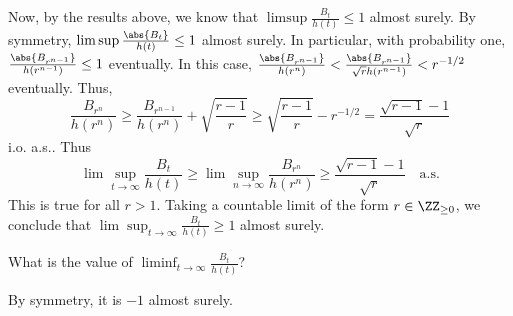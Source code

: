 \documentclass{scrartcl}
\begin{document}
Now, by the results above, we know that $\limsup \frac{B_t}{h(t)} \leq 1$ almost surely. By symmetry, $\limsup \frac{\abs{B_t}}{h(t)} \leq 1$ almost surely. In particular, with probability one, $\frac{\abs{B_{r^{n-1}}}}{h(r^{n-1})} \leq 1$ eventually. In this case, $\frac{\abs{B_{r^{n-1}}}}{h(r^n)} < \frac{\abs{B_{r^{n-1}}}}{\sqrt{r} h(r^{n-1})} < r^{-1/2}$ eventually. Thus,
\[
    \frac{B_{r^n}}{h(r^n)} \geq \frac{B_{r^{n-1}}}{h(r^n)} + \sqrt{\frac{r-1}{r}} \geq \sqrt{\frac{r-1}{r}} - r^{-1/2} = \frac{\sqrt{r-1} - 1}{\sqrt{r}}
\]
i.o. a.s.. Thus
\[
    \lim\sup_{t\to\infty} \frac{B_t}{h(t)} \geq \lim\sup_{n\to\infty} \frac{B_{r^n}}{h(r^n)} \geq \frac{\sqrt{r-1} - 1}{\sqrt{r}} \quad \text{a.s.}
\]
This is true for all $r > 1$. Taking a countable limit of the form $r \in \ZZ_{\geq 0}$, we conclude that $\lim\sup_{t\to\infty} \frac{B_t}{h(t)} \geq 1$ almost surely.





\begin{prob}
    What is the value of $\liminf_{t \to \infty} \frac{B_t}{h(t)}$?
\end{prob}

By symmetry, it is $-1$ almost surely.
\end{document}
